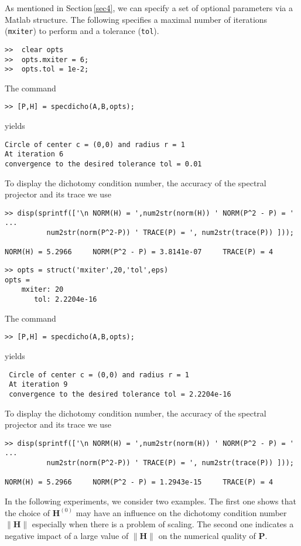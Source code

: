 \documentclass[acmtocl]{acmtrans2m}
\newcommand{\Hm}{\mathbf{H}}
\newcommand{\Pm}{\mathbf{P}}
\begin{document}
As mentioned in Section\,\ref{sec4}, we can specify a set of optional parameters via a {\sc Matlab} structure. The following specifies a maximal number of iterations ({\tt mxiter}) to perform and a tolerance ({\tt tol}).
\begin{verbatim}
>>  clear opts
>>  opts.mxiter = 6;
>>  opts.tol = 1e-2;
\end{verbatim}
The command
\begin{verbatim}
>> [P,H] = specdicho(A,B,opts);
\end{verbatim}
yields
\begin{verbatim}
Circle of center c = (0,0) and radius r = 1
At iteration 6
convergence to the desired tolerance tol = 0.01
\end{verbatim}
To display the dichotomy condition number, the accuracy of the spectral projector and its trace we use
\begin{verbatim}
>> disp(sprintf(['\n NORM(H) = ',num2str(norm(H)) ' NORM(P^2 - P) = ' ...
	      num2str(norm(P^2-P)) ' TRACE(P) = ', num2str(trace(P)) ]));

NORM(H) = 5.2966     NORM(P^2 - P) = 3.8141e-07     TRACE(P) = 4
\end{verbatim}
\begin{verbatim}
>> opts = struct('mxiter',20,'tol',eps)
opts =
    mxiter: 20
       tol: 2.2204e-16
\end{verbatim}
The command
\begin{verbatim}
>> [P,H] = specdicho(A,B,opts);
\end{verbatim}
yields
\begin{verbatim}
 Circle of center c = (0,0) and radius r = 1
 At iteration 9
 convergence to the desired tolerance tol = 2.2204e-16
\end{verbatim}
To display the dichotomy condition number, the accuracy of the spectral projector and its trace we use
\begin{verbatim}
>> disp(sprintf(['\n NORM(H) = ',num2str(norm(H)) ' NORM(P^2 - P) = ' ...
	      num2str(norm(P^2-P)) ' TRACE(P) = ', num2str(trace(P)) ]));

NORM(H) = 5.2966     NORM(P^2 - P) = 1.2943e-15     TRACE(P) = 4
\end{verbatim}

In the following experiments, we consider two examples. The first one shows that the choice of $\Hm^{(0)}$  may have an influence on the  dichotomy condition number $\|\Hm\|$ especially  when there is a problem of scaling. The second one indicates a negative impact of a large value of $\|\Hm\|$ on the numerical quality of $\Pm$.
\end{document}
